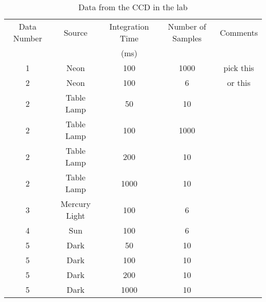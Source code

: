 \documentclass[a4paper,12pt]{article}
\begin{document}
\begin{table}[H]
\centering %
\caption{Data from the CCD in the lab}
\footnotesize

\begin{tabular}{ccccc}%
\hline
\hline

Data Number  & Source & Integration Time & Number of Samples & Comments \\
& & (ms) & &\\

 
\hline
\hline
1   &   Neon            & 100    & 1000 & pick this \\
2   &   Neon            & 100    & 6    & or this\\
2   &   Table Lamp      & 50     & 10   &\\
2   &   Table Lamp      & 100    & 1000 &\\
2   &   Table Lamp      & 200    & 10   &\\
2   &   Table Lamp      & 1000   & 10   &\\
3   &   Mercury Light   & 100    & 6    &\\
4   &   Sun             & 100    & 6    &\\
5   &   Dark            & 50     & 10   &\\
5   &   Dark            & 100    & 10   &\\
5   &   Dark            & 200    & 10   &\\
5   &   Dark            & 1000   & 10   &\\

\hline
\hline

\end{tabular}
\label{table:ccd} %
\end{table}
\end{document}
